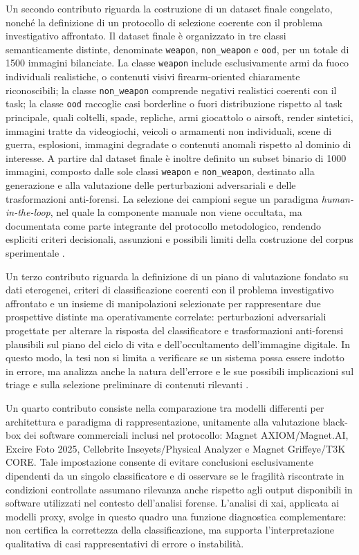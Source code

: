 Un secondo contributo riguarda la costruzione di un dataset finale congelato, nonché la definizione di un protocollo di selezione coerente con il problema investigativo affrontato. Il dataset finale è organizzato in tre classi semanticamente distinte, denominate \texttt{weapon}, \texttt{non\_weapon} e \texttt{ood}, per un totale di 1500 immagini bilanciate. La classe \texttt{weapon} include esclusivamente armi da fuoco individuali realistiche, o contenuti visivi firearm-oriented chiaramente riconoscibili; la classe \texttt{non\_weapon} comprende negativi realistici coerenti con il task; la classe \texttt{ood} raccoglie casi borderline o fuori distribuzione rispetto al task principale, quali coltelli, spade, repliche, armi giocattolo o airsoft, render sintetici, immagini tratte da videogiochi, veicoli o armamenti non individuali, scene di guerra, esplosioni, immagini degradate o contenuti anomali rispetto al dominio di interesse. A partire dal dataset finale è inoltre definito un subset binario di 1000 immagini, composto dalle sole classi \texttt{weapon} e \texttt{non\_weapon}, destinato alla generazione e alla valutazione delle perturbazioni adversariali e delle trasformazioni anti-forensi. La selezione dei campioni segue un paradigma \textit{human-in-the-loop}, nel quale la componente manuale non viene occultata, ma documentata come parte integrante del protocollo metodologico, rendendo espliciti criteri decisionali, assunzioni e possibili limiti della costruzione del corpus sperimentale \cite{sambasivan2021data}.

Un terzo contributo riguarda la definizione di un piano di valutazione fondato su dati eterogenei, criteri di classificazione coerenti con il problema investigativo affrontato e un insieme di manipolazioni selezionate per rappresentare due prospettive distinte ma operativamente correlate: perturbazioni adversariali progettate per alterare la risposta del classificatore e trasformazioni anti-forensi plausibili sul piano del ciclo di vita e dell'occultamento dell'immagine digitale. In questo modo, la tesi non si limita a verificare se un sistema possa essere indotto in errore, ma analizza anche la natura dell'errore e le sue possibili implicazioni sul triage e sulla selezione preliminare di contenuti rilevanti \cite{barni2018cf,nowroozi2024verifying,yaacoub2021digital}.

Un quarto contributo consiste nella comparazione tra modelli differenti per
architettura e paradigma di rappresentazione, unitamente alla valutazione
black-box dei software commerciali inclusi nel protocollo: Magnet
AXIOM/Magnet.AI, Excire Foto 2025, Cellebrite Inseyets/Physical Analyzer e
Magnet Griffeye/T3K CORE. Tale impostazione consente di evitare conclusioni esclusivamente dipendenti da un singolo classificatore e di osservare se le fragilità riscontrate in condizioni controllate assumano rilevanza anche rispetto agli output disponibili in software utilizzati nel contesto dell'analisi forense. L'analisi di \gls{xai}, applicata ai modelli proxy, svolge in questo quadro una funzione diagnostica complementare: non certifica la correttezza della classificazione, ma supporta l'interpretazione qualitativa di casi rappresentativi di errore o instabilità.

